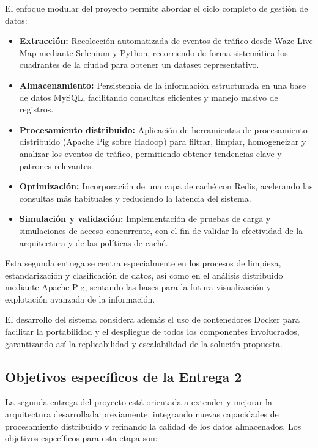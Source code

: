 \documentclass[12pt]{article}
\begin{document}
El enfoque modular del proyecto permite abordar el ciclo completo de gestión de datos:
\begin{itemize}
    \item \textbf{Extracción:} Recolección automatizada de eventos de tráfico desde Waze Live Map mediante Selenium y Python, recorriendo de forma sistemática los cuadrantes de la ciudad para obtener un dataset representativo.
    \item \textbf{Almacenamiento:} Persistencia de la información estructurada en una base de datos MySQL, facilitando consultas eficientes y manejo masivo de registros.
    \item \textbf{Procesamiento distribuido:} Aplicación de herramientas de procesamiento distribuido (Apache Pig sobre Hadoop) para filtrar, limpiar, homogeneizar y analizar los eventos de tráfico, permitiendo obtener tendencias clave y patrones relevantes.
    \item \textbf{Optimización:} Incorporación de una capa de caché con Redis, acelerando las consultas más habituales y reduciendo la latencia del sistema.
    \item \textbf{Simulación y validación:} Implementación de pruebas de carga y simulaciones de acceso concurrente, con el fin de validar la efectividad de la arquitectura y de las políticas de caché.
\end{itemize}

Esta segunda entrega se centra especialmente en los procesos de limpieza, estandarización y clasificación de datos, así como en el análisis distribuido mediante Apache Pig, sentando las bases para la futura visualización y explotación avanzada de la información.

El desarrollo del sistema considera además el uso de contenedores Docker para facilitar la portabilidad y el despliegue de todos los componentes involucrados, garantizando así la replicabilidad y escalabilidad de la solución propuesta.

\subsection*{Objetivos específicos de la Entrega 2}

La segunda entrega del proyecto está orientada a extender y mejorar la arquitectura desarrollada previamente, integrando nuevas capacidades de procesamiento distribuido y refinando la calidad de los datos almacenados. Los objetivos específicos para esta etapa son:
\end{document}
